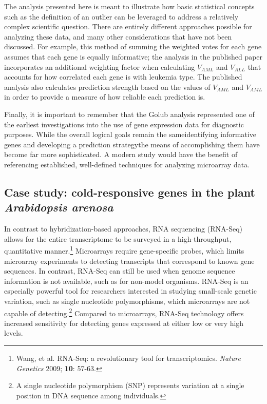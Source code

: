 The analysis presented here is meant to illustrate how basic statistical concepts such as the definition of an outlier can be leveraged to address a relatively complex scientific question. There are entirely different approaches possible for analyzing these data, and many other considerations that have not been discussed. For example, this method of summing the weighted votes for each gene assumes that each gene is equally informative; the analysis in the published paper incorporates an additional weighting factor when calculating $V_{AML}$ and $V_{ALL}$ that accounts for how correlated each gene is with leukemia type. The published analysis also calculates prediction strength based on the values of $V_{AML}$ and $V_{AML}$ in order to provide a measure of how reliable each prediction is. 

\textD{\newpage}

Finally, it is important to remember that the Golub analysis represented one of the earliest investigations into the use of gene expression data for diagnostic purposes. While the overall logical goals remain the same\textemdash identifying informative genes and developing a prediction strategy\textemdash the means of accomplishing them have become far more sophisticated. A modern study would have the benefit of referencing established, well-defined techniques for analyzing microarray data.



\subsection{Case study: cold-responsive genes in the plant \textit{Arabidopsis arenosa}}

In contrast to hybridization-based approaches, RNA sequencing (RNA-Seq) allows for the entire transcriptome to be surveyed in a high-throughput, quantitative manner.\footnote{Wang, et al. RNA-Seq: a revolutionary tool for transcriptomics. \textit{Nature Genetics} 2009; \textbf{10}: 57-63.} Microarrays require gene-specific probes, which limits microarray experiments to detecting transcripts that correspond to known gene sequences. In contrast, RNA-Seq can still be used when genome sequence information is not available, such as for non-model organisms. RNA-Seq is an especially powerful tool for researchers interested in studying small-scale genetic variation, such as single nucleotide polymorphisms, which microarrays are not capable of detecting.\footnote{A single nucleotide polymorphism (SNP) represents variation at a single position in DNA sequence among individuals.} Compared to microarrays, RNA-Seq technology offers increased sensitivity for detecting genes expressed at either low or very high levels.

